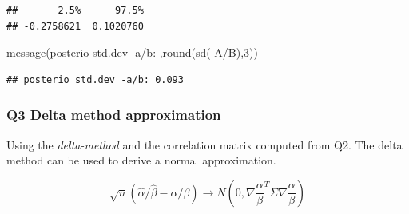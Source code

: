 \documentclass[
]{book}
\newenvironment{Shaded}{\begin{snugshade}}{\end{snugshade}}
\newcommand{\DecValTok}[1]{\textcolor[rgb]{0.00,0.00,0.81}{#1}}
\newcommand{\FunctionTok}[1]{\textcolor[rgb]{0.00,0.00,0.00}{#1}}
\newcommand{\NormalTok}[1]{#1}
\newcommand{\SpecialCharTok}[1]{\textcolor[rgb]{0.00,0.00,0.00}{#1}}
\newcommand{\StringTok}[1]{\textcolor[rgb]{0.31,0.60,0.02}{#1}}
\theoremstyle{definition}
\theoremstyle{definition}
\theoremstyle{definition}
\theoremstyle{definition}
\theoremstyle{remark}
\begin{document}
\begin{verbatim}
##       2.5%      97.5% 
## -0.2758621  0.1020760
\end{verbatim}

\begin{Shaded}
\begin{Highlighting}[]
 \FunctionTok{message}\NormalTok{(}\StringTok{\textquotesingle{}posterio std.dev {-}a/b: \textquotesingle{}}\NormalTok{,}\FunctionTok{round}\NormalTok{(}\FunctionTok{sd}\NormalTok{(}\SpecialCharTok{{-}}\NormalTok{A}\SpecialCharTok{/}\NormalTok{B),}\DecValTok{3}\NormalTok{))}
\end{Highlighting}
\end{Shaded}

\begin{verbatim}
## posterio std.dev -a/b: 0.093
\end{verbatim}

\hypertarget{q3-delta-method-approximation}{%
\subsubsection*{Q3 Delta method approximation}\label{q3-delta-method-approximation}}

Using the \emph{delta-method} and the correlation matrix computed from Q2. The delta method can be used to derive a normal approximation.

\begin{equation}
\sqrt{n}(\hat{\alpha}/\hat{\beta}-\alpha/\beta) \to N(0, \nabla \frac{\alpha}{\beta}^T \Sigma \nabla \frac{\alpha}{\beta})
\end{equation}
\end{document}
